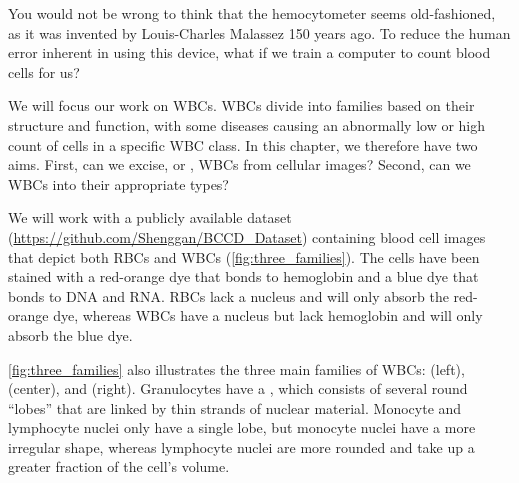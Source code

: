 \begin{qbox}\end{qbox}

You would not be wrong to think that the hemocytometer seems old-fashioned, as it was invented by Louis-Charles Malassez 150 years ago. To reduce the human error inherent in using this device, what if we train a computer to count blood cells for us?

We will focus our work on WBCs. WBCs divide into families based on their structure and function, with some diseases causing an abnormally low or high count of cells in a specific WBC class. In this chapter, we therefore have two aims. First, can we excise, or , WBCs from cellular images?  Second, can we  WBCs into their appropriate types?

We will work with a publicly available dataset (\url{https://github.com/Shenggan/BCCD_Dataset}) containing blood cell images that depict both RBCs and WBCs (\autoref{fig:three_families}). The cells have been stained with a red-orange dye that bonds to hemoglobin and a blue dye that bonds to DNA and RNA. RBCs lack a nucleus and will only absorb the red-orange dye, whereas WBCs have a nucleus but lack hemoglobin and will only absorb the blue dye.

\autoref{fig:three_families} also illustrates the three main families of WBCs:  (left),  (center), and  (right).  Granulocytes have a , which consists of several round ``lobes'' that are linked by thin strands of nuclear material. Monocyte and lymphocyte nuclei only have a single lobe, but monocyte nuclei have a more irregular shape, whereas lymphocyte nuclei are more rounded and take up a greater fraction of the cell's volume.\\


